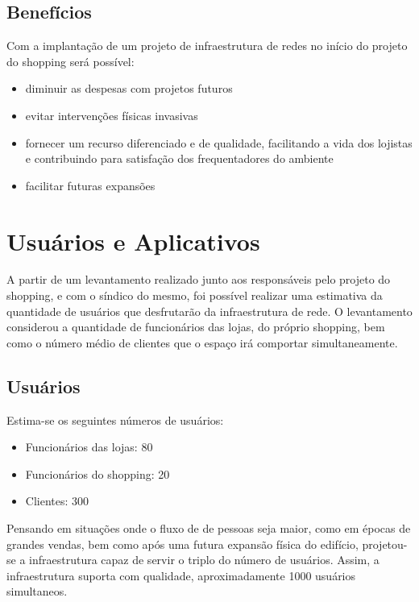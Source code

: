 \documentclass[	DIV=calc,%
							paper=a4,%
							fontsize=12pt,%
							onecolumn]{scrartcl}	 					%
\begin{document}
\subsection{Benefícios}
Com a implantação de um projeto de infraestrutura de redes no início do projeto do shopping será possível:
\begin{itemize}
	\item diminuir as despesas com projetos futuros
	\item evitar intervenções físicas invasivas 
	\item fornecer um recurso diferenciado e de qualidade, facilitando a vida dos lojistas e contribuindo para satisfação dos frequentadores do ambiente
 	\item facilitar futuras expansões 
\end{itemize}

\section{Usuários e Aplicativos}
A partir de um levantamento realizado junto aos responsáveis pelo projeto do shopping, e com o síndico do mesmo, foi possível realizar uma estimativa da quantidade de usuários que desfrutarão da infraestrutura de rede.
O levantamento considerou a quantidade de funcionários das lojas, do próprio shopping, bem como o número médio de clientes que o espaço irá comportar simultaneamente.

\subsection{Usuários}
Estima-se os seguintes números de usuários:
\begin{itemize}
	\item Funcionários das lojas: 80
	\item Funcionários do shopping: 20
	\item Clientes: 300
\end{itemize}

Pensando em situações onde o fluxo de de pessoas seja maior, como em épocas de grandes vendas, bem como após uma futura expansão física do edifício, projetou-se a infraestrutura capaz de servir o triplo do número de usuários.
Assim, a infraestrutura suporta com qualidade, aproximadamente 1000 usuários simultaneos.
\end{document}

